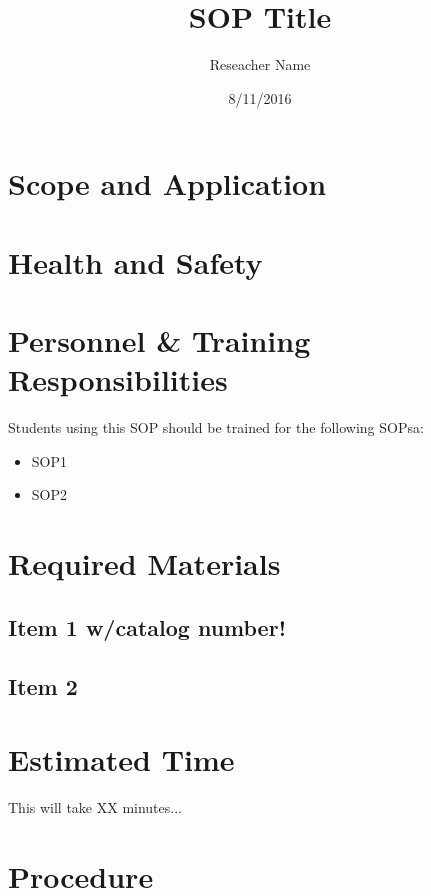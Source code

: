 \documentclass[12pt]{../SOP2}
\title{SOP Title}
\date{8/11/2016}
\author{Reseacher Name}
\begin{document}


\maketitle

\section{Scope and Application}

\NP \blindtext

\NP \lipsum[1]

\section{Health and Safety}

\NP \lipsum[2]


\section{Personnel \& Training Responsibilities}

\NP \lipsum[1]

Students using this SOP should be trained for the following SOPsa:

\begin{itemize}
  \item SOP1
  \item SOP2
\end{itemize}


\section{Required Materials}

\subsection{Item 1 w/catalog number!}
\subsection{Item 2}

\section{Estimated Time}

\NP This will take XX minutes...

\section{Procedure}
\end{document}
